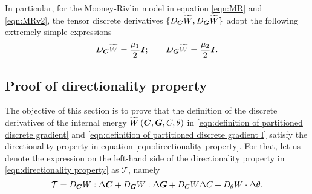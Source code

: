 
In particular, for the Mooney-Rivlin model in equation \eqref{eqn:MR} and \eqref{eqn:MRv2}, the tensor discrete derivatives $\{D_{\boldsymbol{C}}\widetilde{W},D_{\boldsymbol{G}}\widetilde{W}\}$ adopt the following extremely simple expressions
%
\begin{equation}
D_{\boldsymbol{C}}\widetilde{W}= \frac{\mu_1}{2}\boldsymbol{I};\qquad
D_{\boldsymbol{G}}\widetilde{W}= \frac{\mu_2}{2}\boldsymbol{I}.
\end{equation}


\subsection{Proof of directionality property}


The objective of this section is to prove that the definition of the discrete derivatives of the internal energy $\widetilde{W}\left(\boldsymbol{C},\boldsymbol{G},C,\theta\right)$ in \eqref{eqn:definition of partitioned discrete gradient} and \eqref{eqn:definition of partitioned discrete gradient I} satisfy the directionality property in equation \eqref{eqn:directionality property}. For that, let us denote the expression on the left-hand side of the directionality property in \eqref{eqn:directionality property} as $\mathcal{T}$, namely
%
\begin{equation}\label{eqn:directionality property X}
\mathcal{T} = D_{\boldsymbol{C}}W:\Delta\boldsymbol{C} + D_{\boldsymbol{G}}W:\Delta\boldsymbol{G} + D_{{C}}W\Delta{C} + D_{\theta}W\cdot\Delta\theta .
\end{equation}




